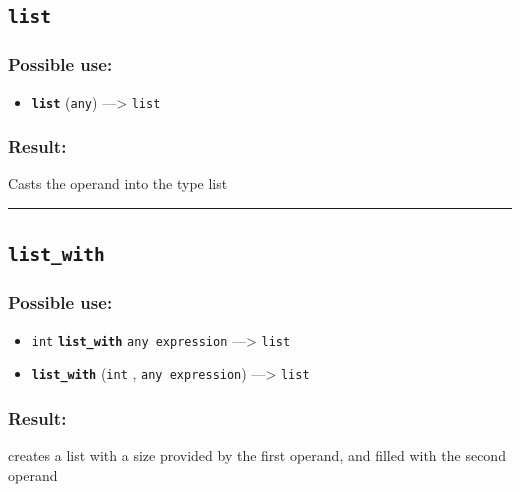 \documentclass[]{book}
\providecommand{\tightlist}{%
  \setlength{\itemsep}{0pt}\setlength{\parskip}{0pt}}
\theoremstyle{definition}
\theoremstyle{definition}
\theoremstyle{definition}
\theoremstyle{remark}
\begin{document}
\subsection{\texorpdfstring{\texttt{list}}{list}}\label{list}

\subsubsection{Possible use:}\label{possible-use-323}

\begin{itemize}
\tightlist
\item
  \textbf{\texttt{list}} (\texttt{any}) ---\textgreater{} \texttt{list}
\end{itemize}

\subsubsection{Result:}\label{result-313}

Casts the operand into the type list

\begin{center}\rule{0.5\linewidth}{\linethickness}\end{center}

\subsection{\texorpdfstring{\texttt{list\_with}}{list\_with}}\label{list_with}

\subsubsection{Possible use:}\label{possible-use-324}

\begin{itemize}
\tightlist
\item
  \texttt{int} \textbf{\texttt{list\_with}} \texttt{any\ expression}
  ---\textgreater{} \texttt{list}
\item
  \textbf{\texttt{list\_with}} (\texttt{int} , \texttt{any\ expression})
  ---\textgreater{} \texttt{list}
\end{itemize}

\subsubsection{Result:}\label{result-314}

creates a list with a size provided by the first operand, and filled
with the second operand
\end{document}
